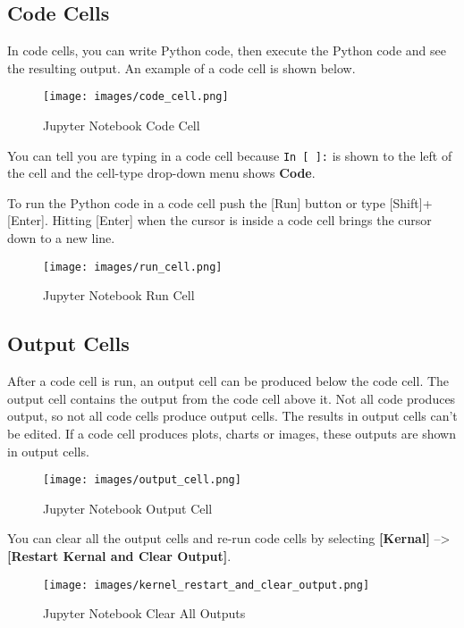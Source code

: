 \documentclass{book}
\makeatletter
\def\maxwidth{\ifdim\Gin@nat@width>\linewidth\linewidth
\else\Gin@nat@width\fi}
\let\Oldincludegraphics\includegraphics
\renewcommand{\includegraphics}[1]{\Oldincludegraphics[width=.8\maxwidth]{#1}}
\newcommand{\passthrough}[1]{#1}
\makeatother
\begin{document}
    
        \hypertarget{code-cells}{%
\subsection{Code Cells}\label{code-cells}}

In code cells, you can write Python code, then execute the Python code
and see the resulting output. An example of a code cell is shown below.

\begin{figure}
\centering
\texttt{[image: images/code\_cell.png]}
\caption{Jupyter Notebook Code Cell}
\end{figure}

You can tell you are typing in a code cell because
\passthrough{\lstinline!In [ ]:!} is shown to the left of the cell and
the cell-type drop-down menu shows \textbf{Code}.

To run the Python code in a code cell push the {[}Run{]} button or type
{[}Shift{]}+{[}Enter{]}. Hitting {[}Enter{]} when the cursor is inside a
code cell brings the cursor down to a new line.

\begin{figure}
\centering
\texttt{[image: images/run\_cell.png]}
\caption{Jupyter Notebook Run Cell}
\end{figure}
    




    
        \hypertarget{output-cells}{%
\subsection{Output Cells}\label{output-cells}}

After a code cell is run, an output cell can be produced below the code
cell. The output cell contains the output from the code cell above it.
Not all code produces output, so not all code cells produce output
cells. The results in output cells can't be edited. If a code cell
produces plots, charts or images, these outputs are shown in output
cells.

\begin{figure}
\centering
\texttt{[image: images/output\_cell.png]}
\caption{Jupyter Notebook Output Cell}
\end{figure}

You can clear all the output cells and re-run code cells by selecting
\textbf{{[}Kernal{]}} --\textgreater{} \textbf{{[}Restart Kernal and
Clear Output{]}}.

\begin{figure}
\centering
\texttt{[image: images/kernel\_restart\_and\_clear\_output.png]}
\caption{Jupyter Notebook Clear All Outputs}
\end{figure}
    
\end{document}
